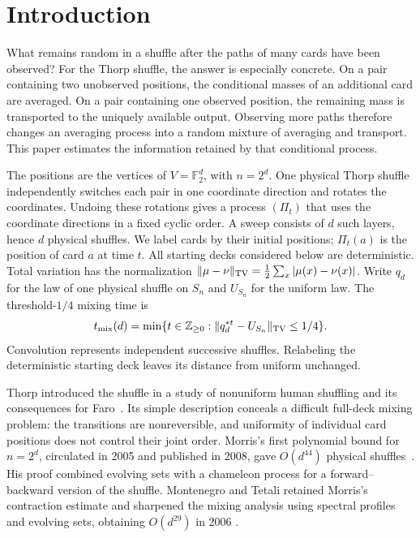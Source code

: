 \section{Introduction}

What remains random in a shuffle after the paths of many cards have
been observed? For the Thorp shuffle, the answer is especially concrete.
On a pair containing two unobserved positions, the conditional masses
of an additional card are averaged. On a pair containing one observed
position, the remaining mass is transported to the uniquely available
output. Observing more paths therefore changes an averaging process
into a random mixture of averaging and transport. This paper estimates
the information retained by that conditional process.

The positions are the vertices of $V=\mathbb F_2^d$, with $n=2^d$.
One physical Thorp shuffle independently switches each pair in one
coordinate direction and rotates the coordinates. Undoing these
rotations gives a process $(\Pi_t)$ that uses the coordinate directions
in a fixed cyclic order. A sweep consists of $d$ such layers, hence
$d$ physical shuffles. We label cards by their initial positions;
$\Pi_t(a)$ is the position of card $a$ at time $t$. All starting
decks considered below are deterministic. Total variation has the
normalization $\|\mu-\nu\|_{\mathrm{TV}}=\frac12\sum_x|\mu(x)-\nu(x)|$.
Write $q_d$ for the law of one physical shuffle on $S_n$ and $U_{S_n}$
for the uniform law. The threshold-$1/4$ mixing time is
\[
 t_{\mathrm{mix}}(d)=\min\{t\in\mathbb Z_{\ge0}:
          \|q_d^{*t}-U_{S_n}\|_{\mathrm{TV}}\le1/4\}.
\]
Convolution represents independent successive shuffles. Relabeling
the deterministic starting deck leaves its distance from uniform unchanged.

Thorp introduced the shuffle in a study of nonuniform human shuffling
and its consequences for Faro~\cite{thorp,morris44}. Its simple description
conceals a difficult full-deck mixing problem: the transitions are
nonreversible, and uniformity of individual card positions does not
control their joint order. Morris's first polynomial bound for $n=2^d$,
circulated in 2005 and published in 2008, gave $O(d^{44})$ physical
shuffles~\cite{morris44}. His proof combined evolving sets with a
chameleon process for a forward--backward version of the shuffle.
Montenegro and Tetali retained Morris's contraction estimate and
sharpened the mixing analysis using spectral profiles and evolving
sets, obtaining $O(d^{29})$ in 2006
\cite[Theorems~6.14--6.15]{montenegro-tetali2006}.

